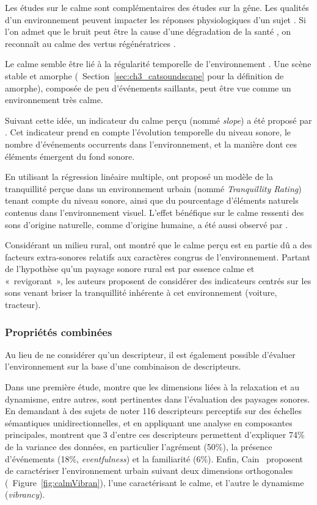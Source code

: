 Les études sur le calme sont complémentaires des études sur la gêne. Les qualités d'un environnement peuvent impacter les réponses physiologiques d'un sujet \citep{hume2013physiological}. Si l'on admet que le bruit peut être la cause d'une dégradation de la santé \citep{stansfeld2005aircraft}, on reconnaît au calme des vertus régénératrices \citep{payne2013production,de2006quiet}.

Le calme semble être lié à la régularité temporelle de l'environnement \citep{delaitre2012definition}. Une scène stable et amorphe (\cf~Section~\ref{sec:ch3_catsoundscape} pour la définition de amorphe), composée de peu d'événements saillants, peut être vue comme un environnement très calme. 

Suivant cette idée, un indicateur du calme perçu (nommé \emph{slope}) a été proposé par \citep{memoli2008soundscape}. Cet indicateur prend en compte l'évolution temporelle du niveau sonore, le nombre d'événements occurrents dans l'environnement, et la manière dont ces éléments émergent du fond sonore. 

En utilisant la régression linéaire multiple, \citep{pheasant2008acoustic,pheasant2009validation} ont proposé un modèle de la tranquillité perçue dans un environnement urbain (nommé \emph{Tranquillity Rating}) tenant compte du niveau sonore, ainsi que du pourcentage d'éléments naturels contenus dans l'environnement visuel. L'effet bénéfique sur le calme ressenti des sons d'origine naturelle, comme d'origine humaine, a été aussi observé par \citep{de2013characterizing}.

Considérant un milieu rural, \citep{de2006quiet} ont montré que le calme perçu est en partie dû a des facteurs extra-sonores relatifs aux caractères congrus de l'environnement. Partant de l'hypothèse qu'un paysage sonore rural est par essence calme et «~revigorant~», les auteurs proposent de considérer des indicateurs centrés sur les sons venant briser la tranquillité inhérente à cet environnement (voiture, tracteur).

\subsubsection{Propriétés combinées}

Au lieu de ne considérer qu'un descripteur, il est également possible d'évaluer l'environnement sur la base d'une combinaison de descripteurs.

Dans une première étude, \citep{kang2006urban} montre que les dimensions liées à la relaxation et au dynamisme, entre autres, sont pertinentes dans l'évaluation des paysages sonores. En demandant à des sujets de noter 116 descripteurs perceptifs sur des échelles sémantiques unidirectionnelles, et en appliquant une analyse en composantes principales, \citep{axelsson2010principal} montrent que 3 d'entre ces descripteurs permettent d'expliquer 74\% de la variance des données, en particulier l'agrément (50\%), la présence d'événements (18\%, \emph{eventfulness}) et la familiarité (6\%). Enfin, Cain~\al \citep{cain2013development} proposent de caractériser l'environnement urbain suivant deux dimensions orthogonales (\cf~Figure~\ref{fig:calmVibran}), l'une caractérisant le calme, et l'autre le dynamisme (\emph{vibrancy}).

